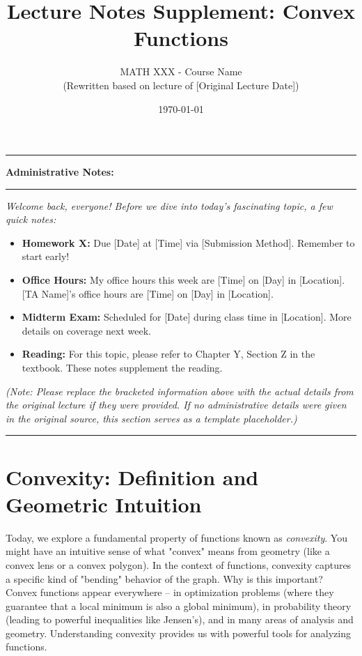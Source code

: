 \documentclass[11pt]{article}
\title{Lecture Notes Supplement: Convex Functions}
\author{MATH XXX - Course Name \\ \small (Rewritten based on lecture of [Original Lecture Date])}
\date{\today} %
\theoremstyle{definition}
\theoremstyle{remark}
\newenvironment{adminnote}{%
  \par\medskip\noindent
  \begin{center} %
  \begin{minipage}{0.9\linewidth} %
  \hrule height 0.5pt \kern 6pt %
  \textbf{Administrative Notes:} \kern 6pt %
  \hrule height 0.5pt \kern 6pt %
  \vspace{\smallskipamount} %
}{%
  \vspace{\smallskipamount} %
  \kern 6pt \hrule height 0.5pt %
  \end{minipage}
  \end{center}
  \par\medskip
}
\begin{document}
\maketitle

\begin{adminnote}
    \textit{Welcome back, everyone! Before we dive into today's fascinating topic, a few quick notes:}
    \begin{itemize}
        \item \textbf{Homework X:} Due [Date] at [Time] via [Submission Method]. Remember to start early!
        \item \textbf{Office Hours:} My office hours this week are [Time] on [Day] in [Location]. [TA Name]'s office hours are [Time] on [Day] in [Location].
        \item \textbf{Midterm Exam:} Scheduled for [Date] during class time in [Location]. More details on coverage next week.
        \item \textbf{Reading:} For this topic, please refer to Chapter Y, Section Z in the textbook. These notes supplement the reading.
    \end{itemize}
    \textit{(Note: Please replace the bracketed information above with the actual details from the original lecture if they were provided. If no administrative details were given in the original source, this section serves as a template placeholder.)}
\end{adminnote}

\section{Convexity: Definition and Geometric Intuition}

Today, we explore a fundamental property of functions known as \emph{convexity}. You might have an intuitive sense of what "convex" means from geometry (like a convex lens or a convex polygon). In the context of functions, convexity captures a specific kind of "bending" behavior of the graph. Why is this important? Convex functions appear everywhere – in optimization problems (where they guarantee that a local minimum is also a global minimum), in probability theory (leading to powerful inequalities like Jensen's), and in many areas of analysis and geometry. Understanding convexity provides us with powerful tools for analyzing functions.
\end{document}
